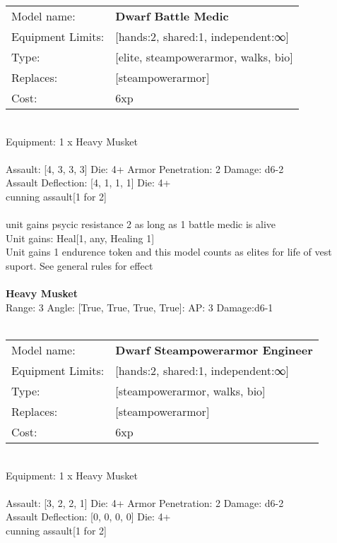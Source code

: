 \noindent
\begin{tabular}{ll}
Model name: &{\bf Dwarf Battle Medic } \\
Equipment Limits: &[hands:2, shared:1, independent:∞] \\
Type: &[elite, steampowerarmor, walks, bio] \\
Replaces: &[steampowerarmor] \\
Cost: & 6xp\\
\end{tabular}
\ \\
Equipment: 1 x Heavy Musket \\
\ \\
Assault: [4, 3, 3, 3] Die: 4+ Armor Penetration: 2 Damage: d6-2 \\
Assault Deflection: [4, 1, 1, 1] Die: 4+\\
\indent cunning assault[1 for 2]\\ 
 
\ \\
unit gains psycic resistance 2 as long as 1 battle medic is alive\\ 
Unit gains: Heal[1, any, Healing 1]\\ 
Unit gains 1 endurence token and this model counts as elites for life of vest suport. See general rules for effect\\ 

\ \\
{\bf Heavy Musket } \\



Range: 3  Angle: [True, True, True, True]: AP: 3 Damage:d6-1 \\




 
\ \\

\noindent
\begin{tabular}{ll}
Model name: &{\bf Dwarf Steampowerarmor Engineer } \\
Equipment Limits: &[hands:2, shared:1, independent:∞] \\
Type: &[steampowerarmor, walks, bio] \\
Replaces: &[steampowerarmor] \\
Cost: & 6xp\\
\end{tabular}
\ \\
Equipment: 1 x Heavy Musket \\
\ \\
Assault: [3, 2, 2, 1] Die: 4+ Armor Penetration: 2 Damage: d6-2 \\
Assault Deflection: [0, 0, 0, 0] Die: 4+\\
\indent cunning assault[1 for 2]\\ 
 
